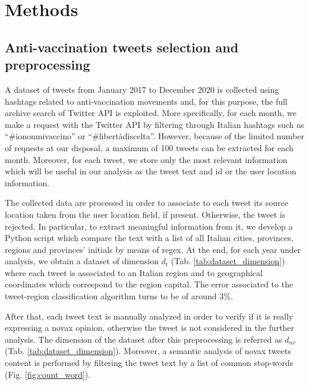 \documentclass[prb,twocolumn,9pt]{revtex4-1}
\begin{document}
\section{Methods}
\label{sec:methods}

\subsection{Anti-vaccination tweets selection and preprocessing}
\label{sec:Anti-vaccination tweets selection and preprocessing}

A dataset of tweets from January 2017 to December 2020 is collected using hashtags related to anti-vaccination movements and, for this purpose, the full archive search of Twitter API is exploited. 
More specifically, for each month, we make a request with the Twitter API by filtering through Italian hashtags such as “$\#$iononmivaccino” or “$\#$libertàdiscelta”. However, because of the limited number of requests at our disposal, a maximum of 100 tweets can be extracted for each month.
Moreover, for each tweet, we store only the most relevant information which will be useful in our analysis as the tweet text and id or the user location information.

The collected data are processed in order to associate to each tweet its source location taken from the user location field, if present. Otherwise, the tweet is rejected. In particular, to extract meaningful information from it, we develop a Python script which compare the text with a list of all Italian cities, provinces, regions and provinces' initials by means of regex. At the end, for each year under analysis, we obtain a dataset of dimension $d_t$ (Tab. \ref{tab:dataset_dimension}) where each tweet is associated to an Italian region and to geographical coordinates which correspond to the region capital. The error associated to the tweet-region classification algorithm turns to be of around $3\%$. 

After that, each tweet text is manually analyzed in order to verify if it is really expressing a novax opinion, otherwise the tweet is not considered in the further analysis. The dimension of the dataset after this preprocessing is referred as $d_{nv}$ (Tab. \ref{tab:dataset_dimension}). Moreover, a semantic analysis of novax tweets content is performed by filtering the tweet text by a list of common stop-words (Fig. \ref{fig:count_word}).
\end{document}
